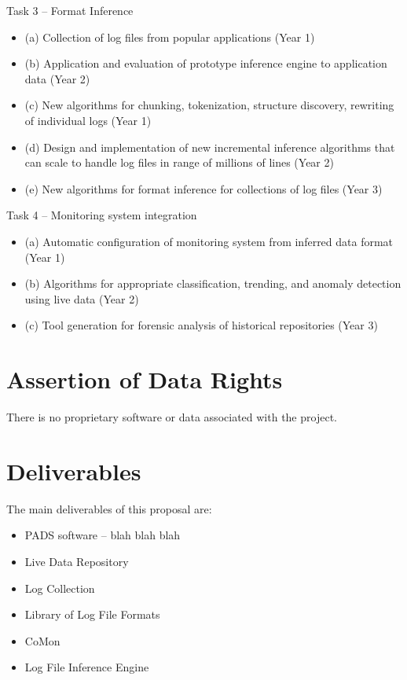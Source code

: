 \documentclass[12pt]{article}
\begin{document}
Task 3 -- Format Inference
\begin{itemize}
\item (a) Collection of log files from popular applications (Year 1)
\item (b) Application and evaluation of prototype inference engine to application data (Year 2)
\item (c) New algorithms for chunking, tokenization, structure discovery, rewriting of individual logs (Year 1)
\item (d) Design and implementation of new incremental inference algorithms that can scale to handle log files in range of millions of lines (Year 2)
\item (e) New algorithms for format inference for collections of log files (Year 3)
\end{itemize}

Task 4 -- Monitoring system integration
\begin{itemize}
\item (a) Automatic configuration of monitoring system from inferred data format (Year 1)
\item (b) Algorithms for appropriate classification, trending, and anomaly detection using live data (Year 2)
\item (c) Tool generation for forensic analysis of historical repositories (Year 3)
\end{itemize}

\section{Assertion of Data Rights}

There is no proprietary software or data associated with the project.

\newpage
\section{Deliverables}

The main deliverables of this proposal are:

\begin{itemize}
\item PADS software -- blah blah blah

\item Live Data Repository

\item Log Collection

\item Library of Log File Formats

\item CoMon

\item Log File Inference Engine

\end{itemize}
\end{document}
